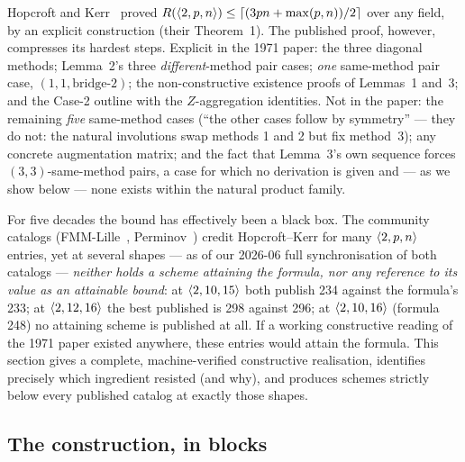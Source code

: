 
Hopcroft and Kerr~\cite{hopcroftkerr1971} proved
\(R(\langle 2, p, n \rangle) \le \lceil (3pn + \max(p,n))/2 \rceil\)
over any field, by an explicit construction (their Theorem~1). The published
proof, however, compresses its hardest steps. Explicit in the 1971 paper:
the three diagonal methods; Lemma~2's three \emph{different}-method pair
cases; \emph{one} same-method pair case, \((1,1,\mathrm{bridge}\text{-}2)\);
the non-constructive existence proofs of Lemmas~1 and~3; and the Case-2
outline with the \(Z\)-aggregation identities. Not in the paper: the
remaining \emph{five} same-method cases (``the other cases follow by
symmetry'' --- they do not: the natural involutions swap methods 1 and 2
but fix method~3); any concrete augmentation matrix; and the fact that
Lemma~3's own sequence forces \((3,3)\)-same-method pairs, a case for which
no derivation is given and --- as we show below --- none exists within the
natural product family.

For five decades the bound has effectively been a black box. The community
catalogs (FMM-Lille~\cite{fmmlille}, Perminov~\cite{perminov}) credit
Hopcroft--Kerr for many \(\langle 2, p, n \rangle\) entries, yet at several
shapes — as of our 2026-06 full synchronisation of both catalogs —
\emph{neither holds a scheme attaining the formula, nor any reference to
its value as an attainable bound}: at \(\langle 2, 10, 15 \rangle\) both publish
234 against the formula's 233; at \(\langle 2, 12, 16 \rangle\) the best
published is 298 against 296; at \(\langle 2, 10, 16 \rangle\) (formula 248) no
attaining scheme is published at all. If a working constructive reading of
the 1971 paper existed anywhere, these entries would attain the formula.
This section gives a complete, machine-verified constructive realisation,
identifies precisely which ingredient resisted (and why), and produces
schemes strictly below every published catalog at exactly those shapes.

\subsection{The construction, in blocks}

